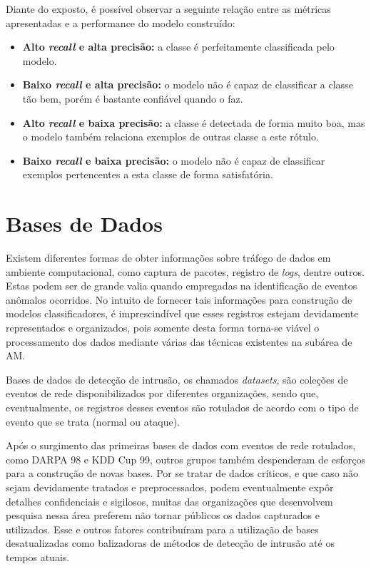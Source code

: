 Diante do exposto, é possível observar a seguinte relação entre as métricas apresentadas e a performance do modelo construído:

\begin{itemize}
    \item \textbf{Alto \textit{recall} e alta precisão:} a classe é perfeitamente classificada pelo modelo.
    \item \textbf{Baixo \textit{recall} e alta precisão:} o modelo não é capaz de classificar a classe tão bem, porém é bastante confiável quando o faz.
    \item \textbf{Alto \textit{recall} e baixa precisão:} a classe é detectada de forma muito boa, mas o modelo também relaciona exemplos de outras classe a este rótulo.
    \item \textbf{Baixo \textit{recall} e baixa precisão:} o modelo não é capaz de classificar exemplos pertencentes a esta classe de forma satisfatória.
\end{itemize}

\section{Bases de Dados}
\label{Sec:bases}

Existem diferentes formas de obter informações sobre tráfego de dados em ambiente computacional, como captura de pacotes, registro de \textit{logs}, dentre outros. Estas podem ser de grande valia quando empregadas na identificação de eventos anômalos ocorridos. No intuito de fornecer tais informações para construção de modelos classificadores, é imprescindível que esses registros estejam devidamente representados e organizados, pois somente desta forma torna-se viável o processamento dos dados mediante várias das técnicas existentes na subárea de AM.

Bases de dados de detecção de intrusão, os chamados \textit{datasets}, são coleções de eventos de rede disponibilizados por diferentes organizações, sendo que, eventualmente, os registros desses eventos são rotulados de acordo com o tipo de evento que se trata (normal ou ataque). 

Após o surgimento das primeiras bases de dados com eventos de rede rotulados, como DARPA 98 e KDD Cup 99, outros grupos também despenderam de esforços para a construção de novas bases. Por se tratar de dados críticos, e que caso não sejam devidamente tratados e preprocessados, podem eventualmente expôr detalhes confidenciais e sigilosos, muitas das organizações que desenvolvem pesquisa nessa área preferem não tornar públicos os dados capturados e utilizados. Esse e outros fatores contribuíram para a utilização de bases desatualizadas como balizadoras de métodos de detecção de intrusão até os tempos atuais.

